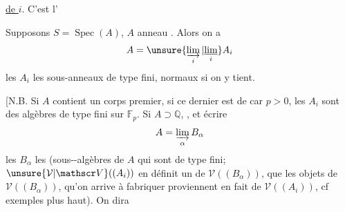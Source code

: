 \uline{de $i$}.  C'est l'

Supposons $S=\operatorname{Spec}(A)$, $A$ anneau   . Alors on a
\[
A=\unsure{\varinjlim_i|\underset{i}{\underline{\lim}}}A_i
\]
les $A_i$ les sous-anneaux de type fini,  normaux  si on y tient.

[N.B.  Si $A$ contient un corps premier, si ce dernier est de car $p>0$, les $A_i$ sont des algèbres de type fini sur $\mathbb F_p$. Si $A\supset\mathbb Q$,  , et écrire
\[
A=\varinjlim_\alpha B_\alpha
\]
les $B_\alpha$ les (sous--algèbres de $A$ qui sont de type fini;   $\unsure{\mathcal V|\mathscr V}((A_i))$ en définit un de $\mathcal V((B_\alpha))$,  que les objets  de $\mathcal V((B_\alpha))$, qu'on arrive à fabriquer proviennent en fait de $\mathcal V((A_i))$, cf exemples plus haut). On dira
